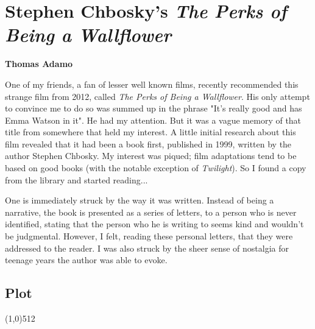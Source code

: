 \documentclass[11pt,a4paper]{report}
\let\origsection\subsection
\renewcommand{\subsection}[1]{\origsection{#1}\vspace{-0.5em}\line(1,0){512}\vspace{-1em}}
\begin{document}
	\clearpage
	
	\section{Stephen Chbosky's \textit{The Perks of Being a Wallflower}}
	
	\textbf{Thomas Adamo}
	
	\begin{multicols}{2}
		
		One of my friends, a fan of lesser well known films, recently recommended this strange film from 2012, called \textit{The Perks of Being a Wallflower}. His only attempt to convince me to do so was summed up in the phrase "It's really good and has Emma Watson in it". He had my attention. But it was a vague memory of that title from somewhere that held my interest. A little initial research about this film revealed that it had been a book first, published in 1999, written by the author Stephen Chbosky. My interest was piqued; film adaptations tend to be based on good books (with the notable exception of \textit{Twilight}). So I found a copy from the library and started reading...
		
		One is immediately struck by the way it was written. Instead of being a narrative, the book is presented as a series of letters, to a person who is never identified, stating that the person who he is writing to seems kind and wouldn't be judgmental. However, I felt, reading these personal letters, that they were addressed to the reader. I was also struck by the sheer sense of nostalgia for teenage years the author was able to evoke.
		
	\end{multicols}
	
	\subsection{Plot}
	
\end{document}
